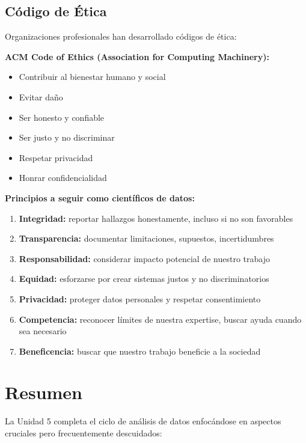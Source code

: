 \documentclass[11pt,a4paper]{article}
\begin{document}
\subsection{Código de Ética}

Organizaciones profesionales han desarrollado códigos de ética:

\textbf{ACM Code of Ethics (Association for Computing Machinery):}
\begin{itemize}
\item Contribuir al bienestar humano y social
\item Evitar daño
\item Ser honesto y confiable
\item Ser justo y no discriminar
\item Respetar privacidad
\item Honrar confidencialidad
\end{itemize}

\textbf{Principios a seguir como científicos de datos:}
\begin{enumerate}
\item \textbf{Integridad:} reportar hallazgos honestamente, incluso si no son favorables
\item \textbf{Transparencia:} documentar limitaciones, supuestos, incertidumbres
\item \textbf{Responsabilidad:} considerar impacto potencial de nuestro trabajo
\item \textbf{Equidad:} esforzarse por crear sistemas justos y no discriminatorios
\item \textbf{Privacidad:} proteger datos personales y respetar consentimiento
\item \textbf{Competencia:} reconocer límites de nuestra expertise, buscar ayuda cuando sea necesario
\item \textbf{Beneficencia:} buscar que nuestro trabajo beneficie a la sociedad
\end{enumerate}

\section{Resumen}

La Unidad 5 completa el ciclo de análisis de datos enfocándose en aspectos cruciales pero frecuentemente descuidados:
\end{document}
